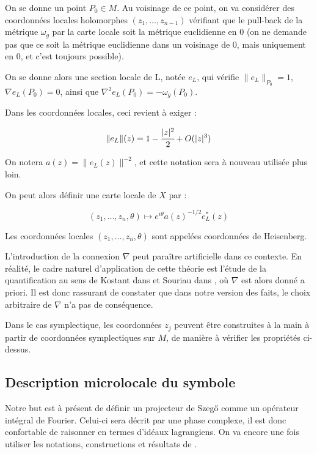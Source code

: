 On se donne un point $P_0 \in M$. Au voisinage de ce point, on va considérer des coordonnées locales holomorphes $(z_1,\ldots, z_{n-1})$ vérifiant que le pull-back de la métrique $\omega_g$ par la carte locale soit la métrique euclidienne en 0 (on ne demande pas que ce soit la métrique euclidienne dans un voisinage de 0, mais uniquement en 0, et c'est toujours possible).

On se donne alors une section locale de L, notée $e_L$, qui vérifie $\|e_L\|_{P_0}=1$, $\nabla e_L(P_0)=0$, ainsi que $\nabla^2e_L(P_0)=-\omega_g(P_0)$.

Dans les coordonnées locales, ceci revient à exiger :

\begin{equation*}
\|e_L\|(z)=1-\cfrac{|z|^2}{2} + O(|z|^3)
\end{equation*}

On notera $a(z)=\|e_L(z)\|^{-2}$, et cette notation sera à nouveau utilisée plus loin.

On peut alors définir une carte locale de $X$ par :

\begin{equation*}
(z_1, \ldots, z_n, \theta) \mapsto e^{i\theta}a(z)^{-1/2}e_L^*(z)
\end{equation*}

Les coordonnées locales $(z_1, \ldots, z_n, \theta)$ sont appelées coordonnées de Heisenberg.

\begin{rem}L'introduction de la connexion $\nabla$ peut paraître artificielle dans ce contexte. En réalité, le cadre naturel d'application de cette théorie est l'étude de la quantification au sens de Kostant dans \cite{kostant1970quantization} et Souriau dans \cite{souriau1967quantification}, où $\nabla$ est alors donné a priori. Il est donc rassurant de constater que dans notre version des faits, le choix arbitraire de $\nabla$ n'a pas de conséquence.\end{rem}
\begin{rem}Dans le cas symplectique, les coordonnées $z_j$ peuvent être construites à la main à partir de coordonnées symplectiques sur $M$, de manière à vérifier les propriétés ci-dessus. \end{rem}

\subsection{Description microlocale du symbole}

Notre but est à présent de définir un projecteur de Szeg\H{o} comme un opérateur intégral de Fourier. Celui-ci sera décrit par une phase complexe, il est donc confortable de raisonner en termes d'idéaux lagrangiens. On va encore une fois utiliser les notations, constructions et résultats de \cite{hormander1985}.

